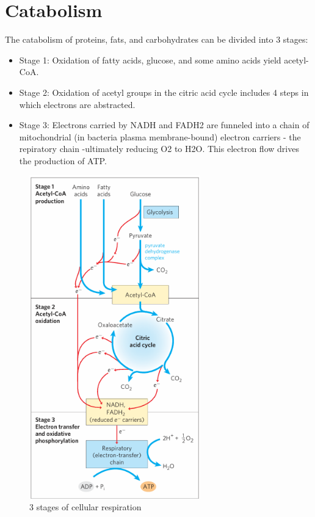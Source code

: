 \documentclass[../main.tex]{subfiles}
\begin{document}
	
\section{Catabolism}
The catabolism of proteins, fats, and carbohydrates can be divided into 3 stages: 
\begin{itemize}
	\item Stage 1: Oxidation of fatty acids, glucose, and some amino acids yield acetyl-CoA.
	\item Stage 2: Oxidation of acetyl groups in the citric acid cycle includes 4 steps in which electrons are abstracted. 
	\item Stage 3: Electrons carried by NADH and FADH2 are funneled into a chain of mitochondrial (in bacteria plasma membrane-bound) electron carriers - the repiratory chain -ultimately reducing O2 to H2O. This electron flow drives the production of ATP. 
\end{itemize}

\begin{figure}[H]
	\centering
	\includegraphics[height = 14cm]{gen1}
	\caption{3 stages of cellular respiration}
\end{figure}
	
\end{document}
